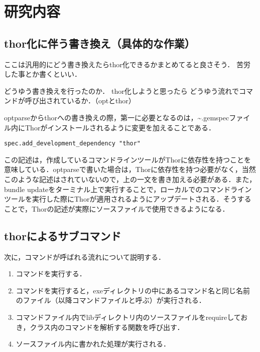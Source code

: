 \chapter{研究内容}\label{ux7814ux7a76ux5185ux5bb9}

\section{thor化に伴う書き換え（具体的な作業）}\label{thorux5316ux306bux4f34ux3046ux66f8ux304dux63dbux3048ux5177ux4f53ux7684ux306aux4f5cux696d}

ここは汎用的にどう書き換えたらthor化できるかまとめてると良さそう．
苦労した事とか書くといい．

どうゆう書き換えを行ったのか． thor化しようと思ったら
どうゆう流れでコマンドが呼び出されているか．（optとthor）

optparseからthorへの書き換えの際，第一に必要となるのは，\textasciitilde{}.gemspecファイル内にThorがインストールされるように変更を加えることである．

\begin{verbatim}
spec.add_development_dependency "thor"
\end{verbatim}

この記述は，作成しているコマンドラインツールがThorに依存性を持つことを意味している．optparseで書いた場合は，Thorに依存性を持つ必要がなく，当然このような記述はされていないので，上の一文を書き加える必要がある．また，bundle
updateをターミナル上で実行することで，ローカルでのコマンドラインツールを実行した際にThorが適用されるようにアップデートされる．そうすることで，Thorの記述が実際にソースファイルで使用できるようになる．

\section{thorによるサブコマンド}\label{thorux306bux3088ux308bux30b5ux30d6ux30b3ux30deux30f3ux30c9}

次に，コマンドが呼ばれる流れについて説明する．

\begin{enumerate}
\def\labelenumi{\arabic{enumi}.}
\tightlist
\item
  コマンドを実行する．
\item
  コマンドを実行すると，exeディレクトリの中にあるコマンド名と同じ名前のファイル（以降コマンドファイルと呼ぶ）が実行される．
\item
  コマンドファイル内でlibディレクトリ内のソースファイルをrequireしておき，クラス内のコマンドを解析する関数を呼び出す．
\item
  ソースファイル内に書かれた処理が実行される．
\end{enumerate}

